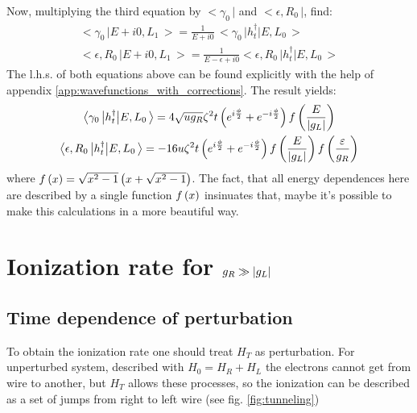 Now, multiplying the third equation by $ \big<\gamma_{0}\,\big| $ and $ \big<\epsilon,R_{0}\,\big |$, find:
\begin{gather}
	\big<\gamma_{0}\,\big|E+i0,L_{1}\,\big>=\frac{1}{E+i0}\,\big<\gamma_{0}\,\big|h_{t}^{\dagger}\big|E,L_{0}\,\big>\\\big<\epsilon,R_{0}\,\big|E+i0,L_{1}\,\big>=\frac{1}{E-\epsilon+i0}\big<\epsilon,R_{0}\,\big|h_{t}^{\dagger}\big|E,L_{0}\,\big>
\end{gather}
The l.h.s. of both equations above can be found explicitly with the help of appendix \ref{app:wavefunctions_with_corrections}. The result yields:
\begin{gather}
\label{tunnel_matrix_elements_maj-cont}
	\big<\gamma_{0}\,\big|h_{t}^{\dagger}\big|E,L_{0}\,\big>
	=
	4\sqrt{ug_{R}}
	\zeta^{2}t
	\left(e^{i\frac{\phi}{2}}+e^{-i\frac{\phi}{2}}\right)
	f\left(\frac{E}{\left|g_L\right|}\right)
	\\
	\label{tunnel_matrix_elements_cont-cont}
	\big<\epsilon,R_{0}\,\big|h_{t}^{\dagger}\big|E,L_{0}\,\big>
	=
	-16u\zeta^{2}t
	\left(e^{i\frac{\phi}{2}}+e^{-i\frac{\phi}{2}}\right)
	f\left(\frac{E}{\left|g_L\right|}\right)
	f\left(\frac{\varepsilon}{g_R}\right)
\end{gather}
where $ f\left(x\right)=\sqrt{x^2-1}\left(x+\sqrt{x^2-1}\right) $. The fact, that all energy dependences here are described by a single function $ f\left(x\right) $ insinuates that, maybe it's possible to make this calculations in a more beautiful way.

\section{Ionization rate for $ g_R\gg\left|g_L\right| $}


\subsection{Time dependence of perturbation}

To obtain the ionization rate one should treat $ H_T $ as perturbation. For unperturbed system, described with $ H_0=H_R+H_L $ the electrons cannot get from wire to another, but $ H_T $ allows these processes, so the ionization can be described as a set of jumps from right to left wire (see fig. \ref{fig:tunneling})


